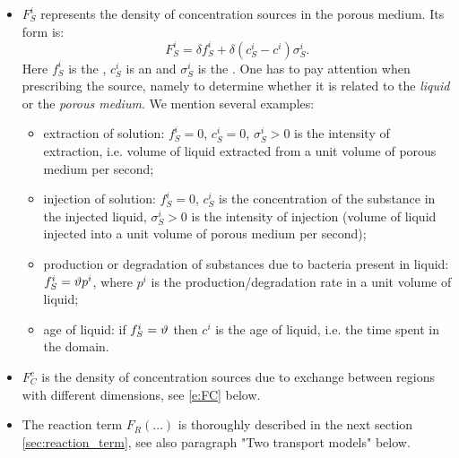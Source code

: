 \begin{itemize}
\item $F_S^i$  represents the density of concentration sources in the porous medium.
Its form is:
\begin{equation}
 F_S^i = \delta f^i_S + \delta(c_S^i-c^i)\sigma_S^i. \label{eqn:transport_sources}
\end{equation}
Here $f_S^i$  is the , $c_S^i$  is an  and $\sigma_S^i$  is the .
One has to pay attention when prescribing the source, namely to determine whether it is related to the \emph{liquid} or the \emph{porous medium}. We mention several examples:
\begin{itemize}
\item extraction of solution: $f_S^i = 0$, $c_S^i = 0$, $\sigma_S^i>0$ is the intensity of extraction, i.e. volume of liquid extracted from a unit volume of porous medium per second;
\item injection of solution: $f_S^i = 0$, $c_S^i$ is the concentration of the substance in the injected liquid, $\sigma_S^i>0$ is the intensity of injection (volume of liquid injected into a unit volume of porous medium per second);
\item production or degradation of substances due to bacteria present in liquid: $f_S^i=\vartheta p^i$, where $p^i$ is the production/degradation rate in a unit volume of liquid;
\item age of liquid: if $f_S^i=\vartheta$ then $c^i$ is the age of liquid, i.e. the time spent in the domain.
\end{itemize}

\item $F^c_C$  is the density of concentration sources due to exchange between regions with different dimensions, see \eqref{e:FC} below.

\item The reaction term $F_R(\dots)$  is thoroughly described in the next section \ref{sec:reaction_term}, see also paragraph "Two transport models" below.
\end{itemize}



